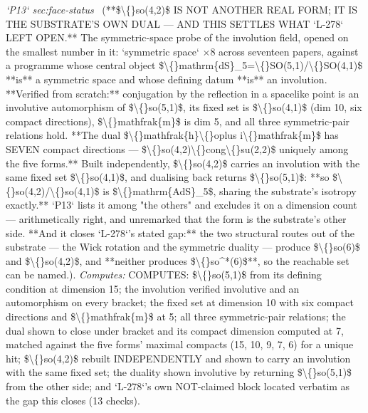 \begin{description}
\textit{`P13` sec:face-status} \ (**\$\textbackslash\{\}so(4,2)\$ IS NOT ANOTHER REAL FORM; IT IS THE SUBSTRATE'S OWN DUAL --- AND THIS SETTLES WHAT `L-278` LEFT OPEN.** The symmetric-space probe of the involution field, opened on the smallest number in it: `symmetric space` \ensuremath{\times}8 across seventeen papers, against a programme whose central object \$\textbackslash\{\}mathrm\{dS\}\_5=\textbackslash\{\}SO(5,1)/\textbackslash\{\}SO(4,1)\$ **is** a symmetric space and whose defining datum **is** an involution. **Verified from scratch:** conjugation by the reflection in a spacelike point is an involutive automorphism of \$\textbackslash\{\}so(5,1)\$, its fixed set is \$\textbackslash\{\}so(4,1)\$ (dim 10, six compact directions), \$\textbackslash\{\}mathfrak\{m\}\$ is dim 5, and all three symmetric-pair relations hold. **The dual \$\textbackslash\{\}mathfrak\{h\}\textbackslash\{\}oplus i\textbackslash\{\}mathfrak\{m\}\$ has SEVEN compact directions --- \$\textbackslash\{\}so(4,2)\textbackslash\{\}cong\textbackslash\{\}su(2,2)\$ uniquely among the five forms.** Built independently, \$\textbackslash\{\}so(4,2)\$ carries an involution with the same fixed set \$\textbackslash\{\}so(4,1)\$, and dualising back returns \$\textbackslash\{\}so(5,1)\$: **so \$\textbackslash\{\}so(4,2)/\textbackslash\{\}so(4,1)\$ is \$\textbackslash\{\}mathrm\{AdS\}\_5\$, sharing the substrate's isotropy exactly.** `P13` lists it among "the others" and excludes it on a dimension count --- arithmetically right, and unremarked that the form is the substrate's other side. **And it closes `L-278`'s stated gap:** the two structural routes out of the substrate --- the Wick rotation and the symmetric duality --- produce \$\textbackslash\{\}so(6)\$ and \$\textbackslash\{\}so(4,2)\$, and **neither produces \$\textbackslash\{\}so\textasciicircum{}*(6)\$**, so the reachable set can be named.). 
\emph{Computes:} COMPUTES: \$\textbackslash\{\}so(5,1)\$ from its defining condition at dimension 15; the involution verified involutive and an automorphism on every bracket; the fixed set at dimension 10 with six compact directions and \$\textbackslash\{\}mathfrak\{m\}\$ at 5; all three symmetric-pair relations; the dual shown to close under bracket and its compact dimension computed at 7, matched against the five forms' maximal compacts (15, 10, 9, 7, 6) for a unique hit; \$\textbackslash\{\}so(4,2)\$ rebuilt INDEPENDENTLY and shown to carry an involution with the same fixed set; the duality shown involutive by returning \$\textbackslash\{\}so(5,1)\$ from the other side; and `L-278`'s own NOT-claimed block located verbatim as the gap this closes (13 checks).

\end{description}
